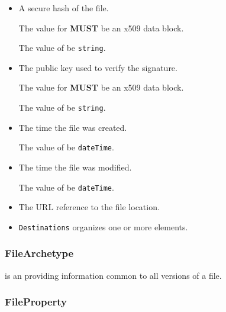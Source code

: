 \begin{itemize}

\item {} \newline A secure hash of the file.

The value for  \textbf{MUST} be an x509 data block.

The value of  \MUST be \texttt{string}.

\item {} \newline The public key used to verify the signature.

The value for  \textbf{MUST} be an x509 data block.

The value of  \MUST be \texttt{string}.

\item {} \newline The time the file was created.

The value of  \MUST be \texttt{dateTime}.

\item {} \newline The time the file was modified.

The value of  \MUST be \texttt{dateTime}.

\item {} \newline The \gls{URL} reference to the file location. 

\item {} \newline \texttt{Destinations} \glspl{organize} one or more  elements.
\end{itemize}



\subsubsection{FileArchetype}
\label{sec:FileArchetype}



  is an  providing information common to all versions of a file.




\subsubsection{FileProperty}
\label{sec:FileProperty}



